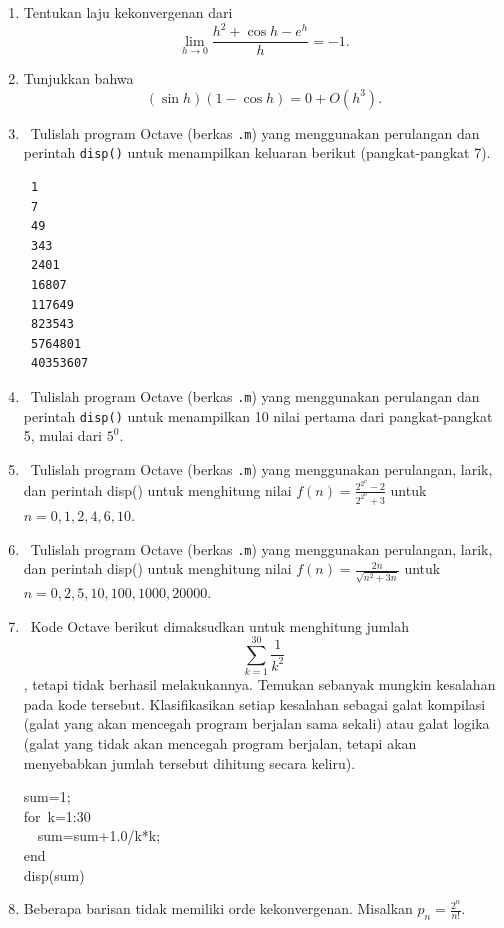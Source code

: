 {\begin{enumerate}
\begin{enumerate}
\item ${\displaystyle \lim_{h\to0}\frac{\sin h}{h}=1}$
\item ${\displaystyle \lim_{h\to0}\frac{1-\cos h}{h}=0}$
\item ${\displaystyle \lim_{h\to0}\frac{\sin h-h\cos h}{h}=0}$
\item ${\displaystyle \lim_{h\to0}\frac{1-e^{h}}{h}=-1}$
\end{enumerate}
\item Tentukan laju kekonvergenan dari 
\[
\lim_{h\to0}\frac{h^{2}+\cos h-e^{h}}{h}=-1.
\]
\item \label{exc:lastFunctionROC}Tunjukkan bahwa 
\[
(\sin h)(1-\cos h)=0+O(h^{3}).
\]
\item \label{exc:convergence-10}\octave\ Tulislah program Octave (berkas
\texttt{.m}) yang menggunakan perulangan dan perintah \texttt{disp()}
untuk menampilkan keluaran berikut (pangkat-pangkat 7). \hasasolution 
\begin{verbatim}
 1
 7
 49
 343
 2401
 16807
 117649
 823543
 5764801
 40353607
\end{verbatim}
\item \octave\ Tulislah program Octave (berkas \texttt{.m}) yang menggunakan
perulangan dan perintah \texttt{disp()} untuk menampilkan 10 nilai
pertama dari pangkat-pangkat 5, mulai dari $5^{0}$.
\item \label{exc:convergence-11}\octave\ Tulislah program Octave (berkas
\texttt{.m}) yang menggunakan perulangan, larik, dan perintah disp()
untuk menghitung nilai ${\displaystyle f(n)=\frac{2^{2^{n}}-2}{2^{2^{n}}+3}}$
untuk $n=0,1,2,4,6,10$. \hasasolution 
\item \octave\ Tulislah program Octave (berkas \texttt{.m}) yang menggunakan
perulangan, larik, dan perintah disp() untuk menghitung nilai ${\displaystyle f(n)=\frac{2n}{\sqrt{n^{2}+3n}}}$
untuk $n=0,2,5,10,100,1000,20000$.
\item \octave\ Kode Octave berikut dimaksudkan untuk menghitung jumlah
\[
\sum_{k=1}^{30}\frac{1}{k^{2}}
\]
, tetapi tidak berhasil melakukannya. Temukan sebanyak mungkin kesalahan
pada kode tersebut. Klasifikasikan setiap kesalahan sebagai galat
kompilasi (galat yang akan mencegah program berjalan sama sekali)
atau galat logika (galat yang tidak akan mencegah program berjalan,
tetapi akan menyebabkan jumlah tersebut dihitung secara keliru).

\begin{lyxcode}
sum=1;~\\
for~k=1:30~\\
~~sum=sum+1.0/k{*}k;~\\
end~\\
disp(sum)
\end{lyxcode}
\item Beberapa barisan tidak memiliki orde kekonvergenan. Misalkan $p_{n}=\frac{2^{n}}{n!}$.


\end{enumerate}}
